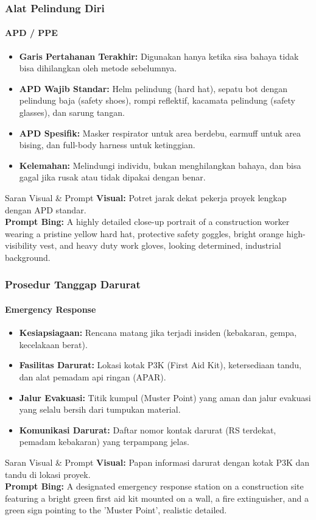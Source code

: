 \documentclass[../main.tex]{subfiles}
\begin{document}
\begin{frame}[mytitle=imageplus, t, mycolor=digiPH_cream]
	\frametitle{Alat Pelindung Diri}
	\framesubtitle{APD / PPE}

	\begin{itemize}
		\item \textbf{Garis Pertahanan Terakhir:} Digunakan hanya ketika sisa bahaya tidak bisa dihilangkan oleh metode sebelumnya.
		\item \textbf{APD Wajib Standar:} Helm pelindung (hard hat), sepatu bot dengan pelindung baja (safety shoes), rompi reflektif, kacamata pelindung (safety glasses), dan sarung tangan.
		\item \textbf{APD Spesifik:} Masker respirator untuk area berdebu, earmuff untuk area bising, dan full-body harness untuk ketinggian.
		\item \textbf{Kelemahan:} Melindungi individu, bukan menghilangkan bahaya, dan bisa gagal jika rusak atau tidak dipakai dengan benar.
	\end{itemize}

	\vfill
	\begin{block}{Saran Visual \& Prompt}
		\scriptsize
		\textbf{Visual:} Potret jarak dekat pekerja proyek lengkap dengan APD standar.\\
		\textbf{Prompt Bing:} A highly detailed close-up portrait of a construction worker wearing a pristine yellow hard hat, protective safety goggles, bright orange high-visibility vest, and heavy duty work gloves, looking determined, industrial background.
	\end{block}
\end{frame}

\begin{frame}[mytitle=standard, t]
	\frametitle{Prosedur Tanggap Darurat}
	\framesubtitle{Emergency Response}

	\begin{itemize}
		\item \textbf{Kesiapsiagaan:} Rencana matang jika terjadi insiden (kebakaran, gempa, kecelakaan berat).
		\item \textbf{Fasilitas Darurat:} Lokasi kotak P3K (First Aid Kit), ketersediaan tandu, dan alat pemadam api ringan (APAR).
		\item \textbf{Jalur Evakuasi:} Titik kumpul (Muster Point) yang aman dan jalur evakuasi yang selalu bersih dari tumpukan material.
		\item \textbf{Komunikasi Darurat:} Daftar nomor kontak darurat (RS terdekat, pemadam kebakaran) yang terpampang jelas.
	\end{itemize}

	\vfill
	\begin{block}{Saran Visual \& Prompt}
		\scriptsize
		\textbf{Visual:} Papan informasi darurat dengan kotak P3K dan tandu di lokasi proyek.\\
		\textbf{Prompt Bing:} A designated emergency response station on a construction site featuring a bright green first aid kit mounted on a wall, a fire extinguisher, and a green sign pointing to the 'Muster Point', realistic detailed.
	\end{block}
\end{frame}
\end{document}
